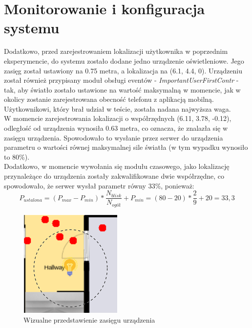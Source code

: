 \section{Monitorowanie i konfiguracja systemu}
Dodatkowo, przed zarejestrowaniem lokalizacji użytkownika w poprzednim eksperymencie, do systemu zostało dodane jedno urządzenie oświetleniowe. Jego zasięg został ustawiony na 0.75 metra, a lokalizacja na (6.1, 4.4, 0). Urządzeniu został również przypisany moduł obsługi eventów - \textit{ImportantUserFirstContr} - tak, aby światło zostało ustawione na wartość maksymalną w momencie, jak w okolicy zostanie zarejestrowana obecność telefonu z aplikacją mobilną. Użytkownikowi, który brał udział w teście, została nadana najwyższa waga.\\
W momencie zarejestrowania lokalizacji o współrzędnych (6.11, 3.78, -0.12), odległość od urządzenia wynosiła 0.63 metra, co oznacza, że znalazła się w zasięgu urządzenia. Spowodowało to wysłanie przez serwer do urządzenia parametru o wartości równej maksymalnej sile światła (w tym wypadku wynosiło to 80\%).\\
Dodatkowo, w momencie wywołania się modułu czasowego, jako lokalizację przynależące do urządzenia zostały zakwalifikowane dwie współrzędne, co spowodowało, że serwer wysłał parametr równy 33\%, ponieważ:
\begin{equation}
P_{ustalona} = (P_{max} - P_{min}) * \frac{N_{blisk}}{N_{ogół}} + P_{min} = (80 - 20) * \frac{2}{9} + 20 = 33,3
\end{equation}
\begin{figure}[H]			
	\centering
	\caption{Wizualne przedstawienie zasięgu urządzenia}
	\includegraphics{dzialanie_urzadze}
\end{figure}
